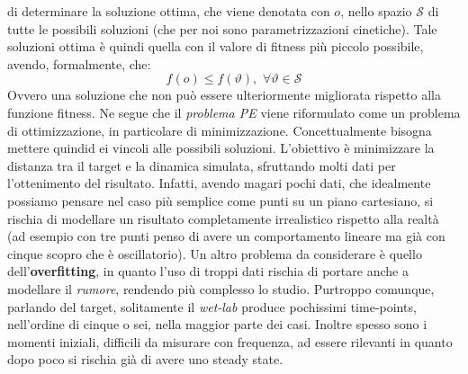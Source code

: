 \documentclass[a4paper,12pt, oneside]{book}
\begin{document}
di 
determinare la soluzione ottima, che viene denotata con $o$, nello spazio
$\mathcal{S}$ di tutte le possibili soluzioni (che per noi sono
parametrizzazioni cinetiche). Tale soluzioni ottima è quindi quella con il
valore di fitness più piccolo possibile, avendo, formalmente, che:
\[f(o)\leq f(\vartheta),\,\,\forall\vartheta\in \mathcal{S}\]
Ovvero una soluzione che non può essere ulteriormente migliorata rispetto alla
funzione fitness. Ne segue che il \textit{problema PE} viene riformulato come un
problema di ottimizzazione, in particolare di minimizzazione. Concettualmente
bisogna mettere quindid ei vincoli alle possibili soluzioni. L'obiettivo è
minimizzare la distanza tra il target e la dinamica simulata, sfruttando molti
dati per l'ottenimento del risultato. Infatti, avendo magari pochi dati, che
idealmente possiamo pensare nel caso più semplice come punti su un piano
cartesiano, si rischia di modellare un risultato completamente irrealistico
rispetto alla realtà (ad esempio con tre punti penso di avere un comportamento
lineare ma già con cinque scopro che è oscillatorio).
Un altro problema da considerare è quello dell'\textbf{overfitting}, in quanto
l'uso di troppi dati rischia di portare anche a modellare il \textit{rumore},
rendendo più complesso lo studio. Purtroppo comunque, parlando del target,
solitamente il \textit{wet-lab} produce pochissimi time-points, nell'ordine di
cinque o sei, nella maggior parte dei casi. Inoltre spesso sono i momenti
iniziali, difficili da misurare con frequenza, ad essere rilevanti in quanto
dopo poco si rischia già di avere uno steady state.
\end{document}
